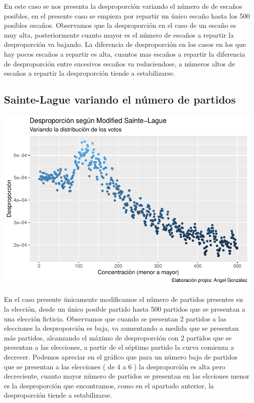 \documentclass[12pt,a4paper,]{book}
\numberwithin{dummy}{section}
\theoremstyle{ocrenumbox}
\theoremstyle{blacknumex}
\theoremstyle{blacknumbox}
\theoremstyle{ocrenum}
\theoremstyle{ocrenum}
\begin{document}
En este caso se nos presenta la desproporción variando el número de de
escaños posibles, en el presente caso se empieza por repartir un único
escaño hasta los 500 posibles escaños. Observamos que la desproporción
en el caso de un escaño es muy alta, posteriormente cuanto mayor es el
número de escaños a repartir la desproporción va bajando. La diferencia
de desproporción en los casos en los que hay pocos escaños a repartir es
alta, cuantos mas escaños a repartir la diferencia de desproporción
entre sucesivos escaños va reduciendose, a números altos de escaños a
repartir la desproporción tiende a estabilizarse.

\hypertarget{sainte-lague-variando-el-nuxfamero-de-partidos}{%
\subsection{Sainte-Lague variando el número de
partidos}\label{sainte-lague-variando-el-nuxfamero-de-partidos}}

\begin{center}\includegraphics[width=0.95\linewidth]{figurasR/unnamed-chunk-18-1} \end{center}

En el caso presente únicamente modificamos el número de partidos
presentes en la elección, desde un único posible partido hasta 500
partidos que se presentan a una elección ficticia. Observamos que cuando
se presentan 2 partidos a las elecciones la desproporción es baja, va
aumentando a medida que se presentan más partidos, alcanzando el máximo
de desproporción con 2 partidos que se presentan a las elecciones, a
partir de el séptimo partido la curva comienza a decrecer. Podemos
apreciar en el gráfico que para un número bajo de partidos que se
presentan a las elecciones ( de 4 a 6 ) la desproporción es alta pero
decreciente, cuanto mayor número de partidos se presentan en las
elcciones menor es la desproporción que encontramos, como en el apartado
anterior, la desproporción tiende a estabilizarse.
\end{document}
